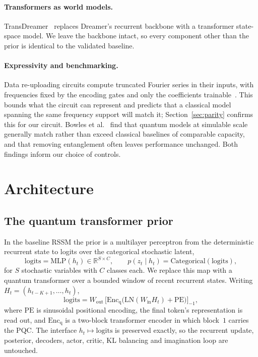 \documentclass[11pt,onecolumn]{article}
\begin{document}
\paragraph{Transformers as world models.}
TransDreamer~\cite{transdreamer} replaces Dreamer's recurrent backbone
with a transformer state-space model. We leave the backbone intact, so
every component other than the prior is identical to the validated
baseline.

\paragraph{Expressivity and benchmarking.}
Data re-uploading circuits compute truncated Fourier series in their
inputs, with frequencies fixed by the encoding gates and only the
coefficients trainable~\cite{schuld2021}. This bounds what the circuit
can represent and predicts that a classical model spanning the same
frequency support will match it; Section~\ref{sec:parity} confirms this
for our circuit. Bowles et al.~\cite{bowles2024} find that quantum
models at simulable scale generally match rather than exceed classical
baselines of comparable capacity, and that removing entanglement often
leaves performance unchanged. Both findings inform our choice of
controls.

\section{Architecture}\label{sec:arch}
\subsection{The quantum transformer prior}
In the baseline RSSM the prior is a multilayer perceptron from the
deterministic recurrent state to logits over the categorical stochastic
latent,
\begin{equation}
  \mathrm{logits} = \mathrm{MLP}(h_t) \in \mathbb{R}^{S \times C},
  \qquad
  p(z_t \mid h_t) = \mathrm{Categorical}(\mathrm{logits}),
\end{equation}
for $S$ stochastic variables with $C$ classes each. We replace this map
with a quantum transformer over a bounded window of recent recurrent
states. Writing $H_t = (h_{t-K+1}, \dots, h_t)$,
\begin{equation}
  \mathrm{logits} = W_{\mathrm{out}}\,
  \Big[\mathrm{Enc}_{\mathrm{q}}\!\big(
      \mathrm{LN}(W_{\mathrm{in}} H_t) + \mathrm{PE}\big)\Big]_{-1},
\end{equation}
where $\mathrm{PE}$ is sinusoidal positional encoding, the final token's
representation is read out, and $\mathrm{Enc}_{\mathrm{q}}$ is a
two-block transformer encoder in which block~$1$ carries the PQC. The
interface $h_t \mapsto \mathrm{logits}$ is preserved exactly, so the
recurrent update, posterior, decoders, actor, critic, KL balancing and
imagination loop are untouched.
\end{document}
